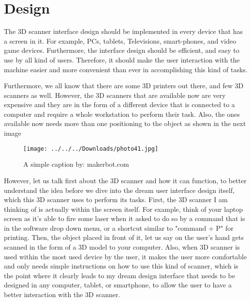 \documentclass[12pt, oneside]{amsart}   	%
\begin{document}
\section{Design}

The 3D scanner interface design should be implemented in every device that has a screen in it.  For example, PCs, tablets, Televisions, smart-phones, and video game devices. Furthermore, the interface design should be efficient, and easy to use by all kind of users. Therefore, it should make the user interaction with the machine easier and more convenient than ever in accomplishing this kind of tasks. 

Furthermore, we all know that there are some 3D printers out there, and few 3D scanners as well.  However, the 3D scanners that are available now are very expensive and they are in the form of a different device that is connected to a computer and require a whole workstation to perform their task.  Also, the ones available now needs more than one positioning to the object as shown in the next image

\begin{figure}[ht!]
\centering
\texttt{[image: ../../../Downloads/photo41.jpg]}
\caption{A simple caption by: makerbot.com}
\label{overflow}
\end{figure}

However, let us talk first about the 3D scanner and how it can function, to better understand the idea before we dive into the dream user interface design itself, which this 3D scanner uses to perform its tasks.
First, the 3D scanner I am thinking of is actually within the screen itself.  For example, think of your laptop screen as it's able to fire some laser when it asked to do so by a command that is in the software drop down menu, or a shortcut similar to "command + P" for printing. Then, the object placed in front of it, let us say on the user's hand gets scanned in the form of a 3D model to your computer.  Also, when 3D scanner is used within the most used device by the user, it makes the user more comfortable and only needs simple instructions on how to use this kind of scanner, which is the point where it clearly leads to my dream design interface that needs to be designed in any computer, tablet, or smartphone, to allow the user to have a better interaction with the 3D scanner.
\end{document}

